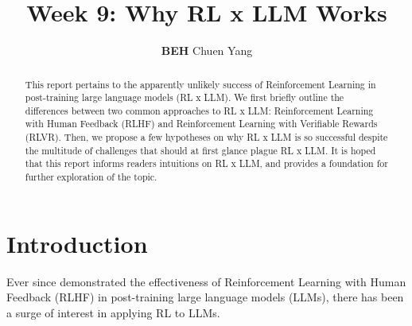 \documentclass{article} %
\title{Week 9: Why RL x LLM Works}
\author{\textbf{BEH} Chuen Yang}
\theoremstyle{definition}
\begin{document}
\ifcolmsubmission
\linenumbers
\fi

\maketitle




\begin{abstract}
    This report pertains to the apparently unlikely success of Reinforcement Learning
    in post-training large language models (RL x LLM).
    We first briefly outline the differences between two common approaches to RL x LLM:
    Reinforcement Learning with Human Feedback (RLHF) and Reinforcement Learning with Verifiable Rewards
    (RLVR). Then, we propose a few hypotheses on why RL x LLM is so successful 
    despite the multitude of challenges that should at first glance plague RL x LLM.
    It is hoped that this report informs readers intuitions on RL x LLM,
    and provides a foundation for further exploration of the topic.
\end{abstract}

\section{Introduction}

Ever since \cite{InstructGPT-2022} demonstrated the effectiveness of 
Reinforcement Learning with Human Feedback (RLHF) 
in post-training large language models (LLMs), 
there has been a surge of interest in applying RL to LLMs. 
\end{document}
